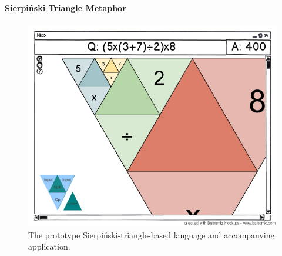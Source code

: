 \documentclass[12pt,twoside,notitlepage,xetex]{report}
\begin{document}
\paragraph{Sierpiński Triangle Metaphor}\hfill

\begin{figure}[H]
\begin{center}
\includegraphics[width=\textwidth]{figs/mockups/sierp/sierp_mockup_full.png}
\caption{The prototype Sierpiński-triangle-based language and accompanying application.}
\label{fig:ProtoTri}
\end{center}
\end{figure}
\end{document}

